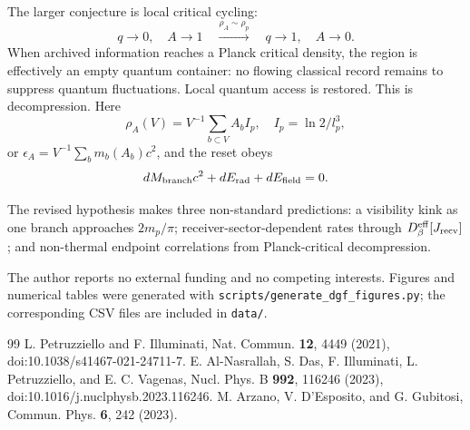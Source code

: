 \documentclass[aps,prl,twocolumn,superscriptaddress,nofootinbib,floatfix]{revtex4-2}
\begin{document}
The larger conjecture is local critical cycling:
\begin{equation}
q\to0,\quad A\to1
\quad
\xrightarrow{\rho_A\sim\rho_p}
\quad
q\to1,\quad A\to0.
\end{equation}
When archived information reaches a Planck critical density, the region is effectively an empty quantum container: no flowing classical record remains to suppress quantum fluctuations. Local quantum access is restored. This is decompression.
Here
\begin{equation}
\rho_A(V)=V^{-1}\sum_{b\subset V}A_bI_p,\quad I_p=\ln2/l_p^3,
\end{equation}
or $\epsilon_A=V^{-1}\sum_bm_b(A_b)c^2$, and the reset obeys
\begin{equation}
dM_{\rm branch}c^2+dE_{\rm rad}+dE_{\rm field}=0.
\end{equation}

The revised hypothesis makes three non-standard predictions: a visibility kink as one branch approaches $2m_p/\pi$; receiver-sector-dependent rates through $D_\beta^{\rm eff}[J_{\rm recv}]$; and non-thermal endpoint correlations from Planck-critical decompression.

\begin{acknowledgments}
The author reports no external funding and no competing interests. Figures and numerical tables were generated with \texttt{scripts/generate\_dgf\_figures.py}; the corresponding CSV files are included in \texttt{data/}.
\end{acknowledgments}

\begin{thebibliography}{99}
 L. Petruzziello and F. Illuminati, Nat. Commun. \textbf{12}, 4449 (2021), doi:10.1038/s41467-021-24711-7.
 E. Al-Nasrallah, S. Das, F. Illuminati, L. Petruzziello, and E. C. Vagenas, Nucl. Phys. B \textbf{992}, 116246 (2023), doi:10.1016/j.nuclphysb.2023.116246.
 M. Arzano, V. D'Esposito, and G. Gubitosi, Commun. Phys. \textbf{6}, 242 (2023).
\end{thebibliography}
\end{document}
